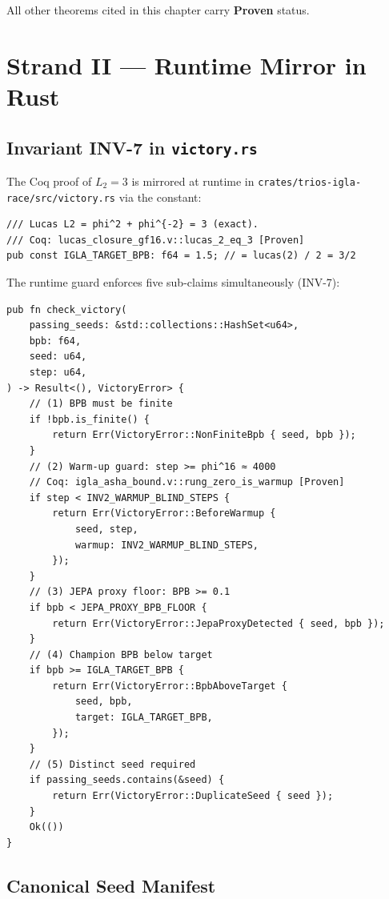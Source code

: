 All other theorems cited in this chapter carry \textbf{Proven} status.

\section{Strand II — Runtime Mirror in Rust}
\label{sec:29-strand-ii}

\subsection{Invariant INV-7 in \texttt{victory.rs}}

The Coq proof of $L_2 = 3$ is mirrored at runtime in
\texttt{crates/trios-igla-race/src/victory.rs} via the constant:

\begin{verbatim}
/// Lucas L2 = phi^2 + phi^{-2} = 3 (exact).
/// Coq: lucas_closure_gf16.v::lucas_2_eq_3 [Proven]
pub const IGLA_TARGET_BPB: f64 = 1.5; // = lucas(2) / 2 = 3/2
\end{verbatim}

The runtime guard enforces five sub-claims simultaneously (INV-7):

\begin{verbatim}
pub fn check_victory(
    passing_seeds: &std::collections::HashSet<u64>,
    bpb: f64,
    seed: u64,
    step: u64,
) -> Result<(), VictoryError> {
    // (1) BPB must be finite
    if !bpb.is_finite() {
        return Err(VictoryError::NonFiniteBpb { seed, bpb });
    }
    // (2) Warm-up guard: step >= phi^16 ≈ 4000
    // Coq: igla_asha_bound.v::rung_zero_is_warmup [Proven]
    if step < INV2_WARMUP_BLIND_STEPS {
        return Err(VictoryError::BeforeWarmup {
            seed, step,
            warmup: INV2_WARMUP_BLIND_STEPS,
        });
    }
    // (3) JEPA proxy floor: BPB >= 0.1
    if bpb < JEPA_PROXY_BPB_FLOOR {
        return Err(VictoryError::JepaProxyDetected { seed, bpb });
    }
    // (4) Champion BPB below target
    if bpb >= IGLA_TARGET_BPB {
        return Err(VictoryError::BpbAboveTarget {
            seed, bpb,
            target: IGLA_TARGET_BPB,
        });
    }
    // (5) Distinct seed required
    if passing_seeds.contains(&seed) {
        return Err(VictoryError::DuplicateSeed { seed });
    }
    Ok(())
}
\end{verbatim}

\subsection{Canonical Seed Manifest}

